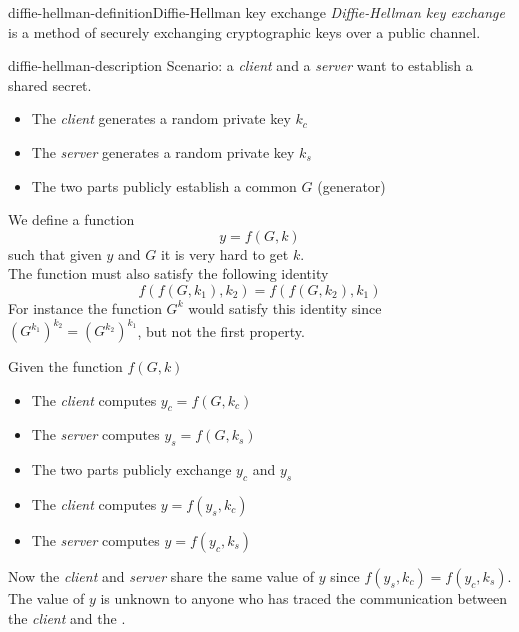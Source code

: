 \documentclass[preview]{standalone}
\begin{document}
\genpage

\begin{snippetdefinition}{diffie-hellman-definition}{Diffie-Hellman key exchange}
    \textit{Diffie-Hellman key exchange} is a method of securely exchanging
    cryptographic keys over a public channel.
\end{snippetdefinition}

\begin{snippet}{diffie-hellman-description}
Scenario: a \textit{client} and a \textit{server} want to establish a shared secret.
\begin{itemize}
	\item The \textit{client} generates a random private key \(k_c\)
	\item The \textit{server} generates a random private key \(k_s\)
	\item The two parts publicly establish a common \(G\) (generator)
\end{itemize}

We define a function
\[
	y=f(G,k)
\]
such that given \(y\) and \(G\) it is very hard to get \(k\).\\
The function must also satisfy the following identity
\[
	f(f(G, k_1), k_2)=f(f(G, k_2), k_1)
\]
For instance the function \(G^k\) would satisfy this identity since \({\left(G^{k_1}\right)}^{k_2}={\left(G^{k_2}\right)}^{k_1}\), but not the first property.

Given the function \(f(G,k)\)
\begin{itemize}
	\item The \textit{client} computes \(y_c=f(G,k_c)\)
	\item The \textit{server} computes \(y_s=f(G,k_s)\)
	\item The two parts publicly exchange \(y_c\) and \(y_s\)
	\item The \textit{client} computes \(y=f(y_s,k_c)\)
	\item The \textit{server} computes \(y=f(y_c,k_s)\)
\end{itemize}
Now the \textit{client} and \textit{server} share the same value of \(y\) since \(f(y_s,k_c)=f(y_c,k_s)\).\\
The value of \(y\) is unknown to anyone who has traced the communication between the \textit{client} and the .
\end{snippet}
\end{document}
